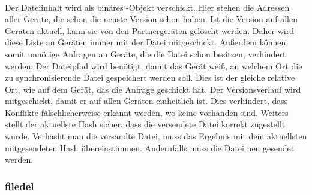 	\begin{rightwordgroup}{\isprotomsgdata}
		 \\
		\skippedwords \\
		 \\
		 \\
		\skippedwords \\
		 \\
		 \\
		\skippedwords \\
		 \\
		 \\
		\skippedwords \\
	\end{rightwordgroup}
	

\begin{description}
		Der Dateiinhalt wird als binäres -Objekt verschickt.
		Hier stehen die Adressen aller Geräte, die schon die neuste Version schon haben. Ist die Version auf allen Geräten aktuell, kann sie von den Partnergeräten gelöscht werden. Daher wird diese Liste an Geräten immer mit der Datei mitgeschickt. Außerdem können somit unnötige Anfragen an Geräte, die die Datei schon besitzen, verhindert werden.
		Der Dateipfad wird benötigt, damit das Gerät weiß, an welchem Ort die zu synchronisierende Datei gespeichert werden soll. Dies ist der gleiche relative Ort, wie auf dem Gerät, das die Anfrage geschickt hat.
		Der Versionsverlauf wird mitgeschickt, damit er auf allen Geräten einheitlich ist. Dies verhindert, dass Konflikte fälschlicherweise erkannt werden, wo keine vorhanden sind. Weiters stellt der aktuellste Hash sicher, dass die versendete Datei korrekt zugestellt wurde. Verhasht man die versandte Datei, muss das Ergebnis mit dem aktuellsten mitgesendeten Hash übereinstimmen. Andernfalls muss die Datei neu gesendet werden.
\end{description}
		
\subsubsection{\gls{filedel}}
\messagestart
	 \\
	
